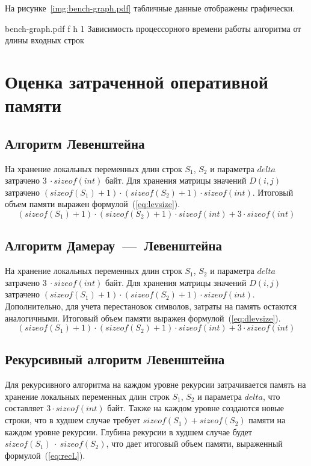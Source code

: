 \clearpage

На рисунке~\ref{img:bench-graph.pdf} табличные данные отображены графически.

{bench-graph.pdf} %
{f} %
{h} %
{1 \textwidth} %
{Зависимость процессорного времени работы алгоритма от длины входных строк} %

\clearpage

\section{Оценка затраченной оперативной памяти}

\subsection{Алгоритм Левенштейна}
На хранение локальных переменных длин строк $S_1$, $S_2$ и параметра $delta$ затрачено $3~\cdot sizeof(int)$ байт. Для хранения матрицы значений $D(i,j)$ затрачено $(sizeof(S_1) + 1) \cdot (sizeof(S_2) + 1) \cdot sizeof(int)$. Итоговый объем памяти выражен формулой~(\ref{eq:levsize}).
\begin{equation}
    \label{eq:levsize}
    (sizeof(S_1) + 1) \cdot (sizeof(S_2) + 1) \cdot sizeof(int) + 3 \cdot sizeof(int)
\end{equation}

\subsection{Алгоритм Дамерау~---~Левенштейна}
На хранение локальных переменных длин строк $S_1$, $S_2$ и параметра $delta$ затрачено $3~\cdot sizeof(int)$ байт. Для хранения матрицы значений $D(i,j)$ затрачено $(sizeof(S_1) + 1) \cdot (sizeof(S_2) + 1) \cdot sizeof(int)$. Дополнительно, для учета перестановок символов, затраты на память остаются аналогичными. Итоговый объем памяти выражен формулой~(\ref{eq:dlevsize}).
\begin{equation}
    \label{eq:dlevsize}
    (sizeof(S_1) + 1) \cdot (sizeof(S_2) + 1) \cdot sizeof(int) + 3 \cdot sizeof(int)
\end{equation}

\subsection{Рекурсивный алгоритм Левенштейна}
Для рекурсивного алгоритма на каждом уровне рекурсии затрачивается память на хранение локальных переменных длин строк $S_1$, $S_2$ и параметра $delta$, что составляет $3 \cdot sizeof(int)$ байт. Также на каждом уровне создаются новые строки, что в худшем случае требует $sizeof(S_1) + sizeof(S_2)$ памяти на каждом уровне рекурсии. Глубина рекурсии в худшем случае будет $sizeof(S_1)~\cdot~sizeof(S_2)$, что дает итоговый объем памяти, выраженный формулой~(\ref{eq:recL}).

